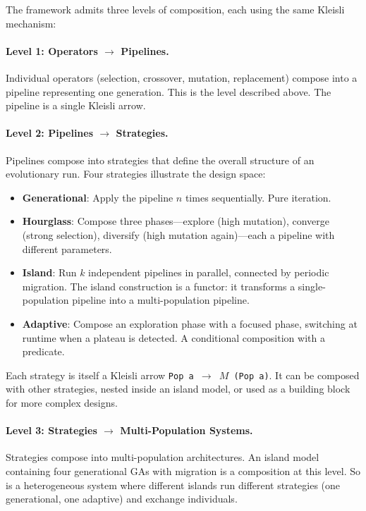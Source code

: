 \documentclass[dvipsnames,format=sigconf,anonymous=true,review=true]{acmart}
\begin{document}
The framework admits three levels of composition, each using the same Kleisli mechanism:

\paragraph{Level 1: Operators $\to$ Pipelines.}
Individual operators (selection, crossover, mutation, replacement) compose into a pipeline representing one generation. This is the level described above. The pipeline is a single Kleisli arrow.

\paragraph{Level 2: Pipelines $\to$ Strategies.}
Pipelines compose into strategies that define the overall structure of an evolutionary run. Four strategies illustrate the design space:

\begin{itemize}[nosep]
  \item \textbf{Generational}: Apply the pipeline $n$ times sequentially. Pure iteration.
  \item \textbf{Hourglass}: Compose three phases---explore (high mutation), converge (strong selection), diversify (high mutation again)---each a pipeline with different parameters.
  \item \textbf{Island}: Run $k$ independent pipelines in parallel, connected by periodic migration. The island construction is a functor: it transforms a single-population pipeline into a multi-population pipeline.
  \item \textbf{Adaptive}: Compose an exploration phase with a focused phase, switching at runtime when a plateau is detected. A conditional composition with a predicate.
\end{itemize}

\noindent Each strategy is itself a Kleisli arrow \texttt{Pop\,a $\to$ $M$\,(Pop\,a)}. It can be composed with other strategies, nested inside an island model, or used as a building block for more complex designs.

\paragraph{Level 3: Strategies $\to$ Multi-Population Systems.}
Strategies compose into multi-population architectures. An island model containing four generational GAs with migration is a composition at this level. So is a heterogeneous system where different islands run different strategies (one generational, one adaptive) and exchange individuals.
\end{document}
